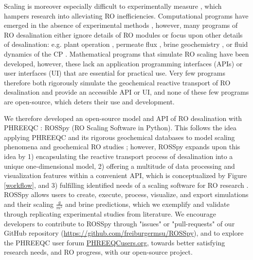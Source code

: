\documentclass[journal=ACSES&TWater,manuscript=article]{achemso}
\begin{document}
Scaling is moreover especially difficult to experimentally measure \cite{Hu2014Real-timeSpectroscopy,Butt1995IdentificationAutopsy,Sheikholeslami2003KineticsM}, which hampers research into alleviating RO inefficiencies. Computational programs \cite{Giere2009IsExperimentation,Wijmans1995TheReview} have emerged in the absence of experimental methods \cite{Strubbe2018CalibrationFull-Scale,Lenhard2007ComputerModeling}, however, many programs of RO desalination either ignore details of RO modules \cite{2018ZeroPHREEQC} or focus upon other details of desalination: e.g. plant operation \cite{DesalitechROSASoftware,Chee2018PerformanceSoftware,SysCAD2020PHREEQCUnit,Bouchareb2019ExperimentalDesalination}, permeate flux \cite{Xu2012TOUGHREACT.0,Steefel2015ReactiveSimulation}, brine geochemistry \cite{Kundu2018TechnicalTechnology}, or fluid dynamics of the CP \cite{Walker2003AssessmentReaction}. Mathematical programs that simulate RO scaling  have been developed, however, these lack an application programming interfaces (APIs) or user interfaces (UI) \cite{Radu2014ASystems,Karabelas2019PredictionSimulator} that are essential for practical use. Very few programs \cite{SoftwareReverseOsmosis} therefore both rigorously simulate the geochemical reactive transport of RO desalination and provide an accessible API or UI, and none of these few programs are open-source, which deters their use and development. 

We therefore developed an open-source model and API of RO desalination with PHREEQC \cite{Parkhurst2015PhreeqcRM:PHREEQC,Charlton2011ModulesLanguages}: ROSSpy (RO Scaling Software in Python). This follows the idea applying PHREEQC and its rigorous geochemical databases to model scaling phenomena \cite{Mitrouli2016CalciumExperiments,Warsinger2018InorganicOsmosis} and geochemical RO studies \cite{Bein1993OriginBrine,Wilson1993GeochemistryFormations,Casas2012SeawaterElectrodialysis,Yan2017ReverseVelocity}; however, ROSSpy expands upon this idea by 1) encapsulating the reactive transport process of desalination into a unique one-dimensional model, 2) offering a multitude of data processing and visualization features within a convenient API, which is conceptualized by Figure \ref{workflow}, and 3) fulfilling identified needs of a scaling software for RO research \cite{Karabelas2020ScalingTools}. ROSSpy allows users to create, execute, process, visualize, and export simulations and their scaling $\frac{g}{m^2}$ and brine predictions, which we exemplify and validate through replicating experimental studies from literature. We encourage developers to contribute to ROSSpy through "issues" or "pull-requests" of our GitHub repository (\url{https://github.com/freiburgermsu/ROSSpy}), and to explore the PHREEQC user forum \url{PHREEQCusers.org}, towards better satisfying research needs, and RO progress, with our open-source project. 
\end{document}

